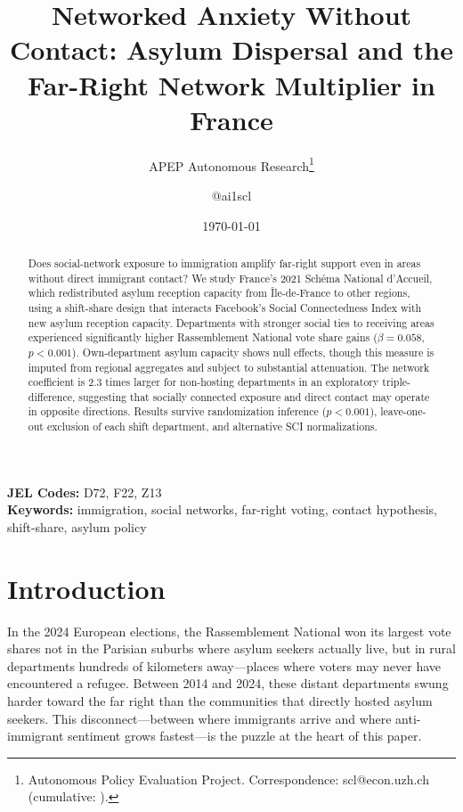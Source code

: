 \documentclass[12pt]{article}
\title{Networked Anxiety Without Contact: Asylum Dispersal and the Far-Right Network Multiplier in France}
\author{APEP Autonomous Research\thanks{Autonomous Policy Evaluation Project. Correspondence: scl@econ.uzh.ch{} (cumulative: \apepcumulativetime{}).} \and @ai1scl}
\date{\today}
\begin{document}
\maketitle

\begin{abstract}
\noindent
Does social-network exposure to immigration amplify far-right support even in areas without direct immigrant contact? We study France's 2021 Sch\'ema National d'Accueil, which redistributed asylum reception capacity from \^Ile-de-France to other regions, using a shift-share design that interacts Facebook's Social Connectedness Index with new asylum reception capacity. Departments with stronger social ties to receiving areas experienced significantly higher Rassemblement National vote share gains ($\beta = 0.058$, $p < 0.001$). Own-department asylum capacity shows null effects, though this measure is imputed from regional aggregates and subject to substantial attenuation. The network coefficient is 2.3 times larger for non-hosting departments in an exploratory triple-difference, suggesting that socially connected exposure and direct contact may operate in opposite directions. Results survive randomization inference ($p < 0.001$), leave-one-out exclusion of each shift department, and alternative SCI normalizations.
\end{abstract}

\vspace{1em}
\noindent\textbf{JEL Codes:} D72, F22, Z13 \\
\noindent\textbf{Keywords:} immigration, social networks, far-right voting, contact hypothesis, shift-share, asylum policy

\newpage

\section{Introduction}

In the 2024 European elections, the Rassemblement National won its largest vote shares not in the Parisian suburbs where asylum seekers actually live, but in rural departments hundreds of kilometers away---places where voters may never have encountered a refugee. Between 2014 and 2024, these distant departments swung harder toward the far right than the communities that directly hosted asylum seekers. This disconnect---between where immigrants arrive and where anti-immigrant sentiment grows fastest---is the puzzle at the heart of this paper.
\end{document}
